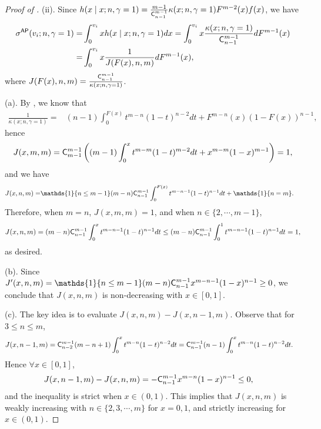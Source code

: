 \begin{proof}[{Proof of }]
(ii). Since $h(x\mid x;n,\gamma = 1) = \frac{m-1}{\mathsf{C}^{m-1}_{n-1}}\kappa(x; n, \gamma = 1)F^{m-2}(x)f(x)$, we have 
\begin{align*}
    \sigma^{\mathsf{AP}}(v_i;n,\gamma = 1)
  =&\int_0^{v_i} x h(x\mid x;n,\gamma = 1)dx 
  = \int_0^{v_i} x \frac{\kappa(x; n, \gamma = 1)}{\mathsf{C}^{m-1}_{n-1}}dF^{m-1}(x) \\=& \int_0^{v_i} x \frac{1}{J(F(x), n, m)}dF^{m-1}(x), 
\end{align*}
where $J(F(x), n, m) = \frac{\mathsf{C}^{m-1}_{n-1}}{\kappa(x; n, \gamma = 1)}$.

(a). By , we know that 
\begin{align*}
 \frac{1}{\kappa(x; n, \gamma = 1)} =& (n-1)\int_0^{F(x)}t^{m-n}(1-t)^{n-2}dt + F^{m-n}(x)(1-F(x))^{n-1},  
\end{align*}
hence 
\begin{align*}
    J(x, m, m) = \mathsf{C}^{m-1}_{m-1}\left((m-1)\int_0^{x}t^{m-m}(1-t)^{m-2}dt + x^{m-m}(1-x)^{m-1} \right) = 1,
\end{align*}
and we have
\begin{align*}
 J(x, n, m) = & \mathds{1}\{n\leq m-1\}(m-n)\C^{m-1}_{n-1}\int_0^{F(x)}t^{m-n-1}(1-t)^{n-1}dt + \mathds{1}\{n = m\}.   
\end{align*}
Therefore, when $m=n$, $J(x, m, m) = 1$, and when $n\in \{2,\cdots, m-1\}$, 
\begin{align*}
J(x, n, m) = (m-n)\mathsf{C}^{m-1}_{n-1} \int_0^{x}t^{m-n-1}(1-t)^{n-1}dt \leq (m-n)\mathsf{C}^{m-1}_{n-1} \int_0^{1}t^{m-n-1}(1-t)^{n-1}dt = 1,    
\end{align*}
as desired.

(b). Since $J'(x, n, m) = \mathds{1}\{n\leq m-1\}(m-n)\C^{m-1}_{n-1} x^{m-n-1}(1-x)^{n-1} \geq 0$, we conclude that $J(x, n, m)$ is non-decreasing with $x\in[0,1]$.

(c). The key idea is to evaluate $J(x,n, m)-J(x,n-1, m)$. Observe that for $3\leq n\leq m$, 
\begin{align}
     J(x,n-1, m) &= \mathsf{C}^{m-1}_{n-2} (m-n+1)\int_0^{x}t^{m-n}(1-t)^{n-2}dt =\mathsf{C}^{m-1}_{n-1}(n-1)\int_0^{x}t^{m-n}(1-t)^{n-2}dt. \nonumber 
\end{align}
Hence $\forall x \in [0,1]$,
\begin{align}
     J(x,n-1, m)- J(x,n, m)&=-\mathsf{C}^{m-1}_{n-1}x^{m-n}(1-x)^{n-1}\leq 0\nonumber, 
\end{align}
and the inequality is strict when $x\in (0,1)$. This implies that $J(x,n, m)$ is weakly increasing with $n\in \{2, 3, \cdots, m\}$ for $x=0,1$, and strictly increasing for $x\in (0,1)$.

\end{proof}
